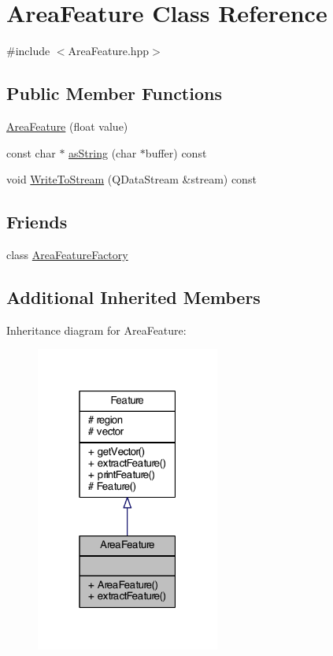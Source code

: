 \hypertarget{class_area_feature}{\section{Area\+Feature Class Reference}
\label{class_area_feature}
}


{\ttfamily \#include $<$Area\+Feature.\+hpp$>$}

\subsection*{Public Member Functions}
\begin{DoxyCompactItemize}
\item 
\hyperlink{class_area_feature_af65d43c5c868babfb6c429464f36a898}{Area\+Feature} (float value)
\item 
const char $\ast$ \hyperlink{class_area_feature_a6c0a6e3346ba2ddaa4a50cb957f08ab2}{as\+String} (char $\ast$buffer) const 
\item 
void \hyperlink{class_area_feature_a8d2f99d3cc8ff64b90c2eb8a4c97a72f}{Write\+To\+Stream} (Q\+Data\+Stream \&stream) const 
\end{DoxyCompactItemize}
\subsection*{Friends}
\begin{DoxyCompactItemize}
\item 
class \hyperlink{class_area_feature_acf274ff5848a30a105c61f0e1c56cf7e}{Area\+Feature\+Factory}
\end{DoxyCompactItemize}
\subsection*{Additional Inherited Members}


Inheritance diagram for Area\+Feature\+:\nopagebreak
\begin{figure}[H]
\begin{center}
\leavevmode
\includegraphics[width=171pt]{class_area_feature__inherit__graph}
\end{center}
\end{figure}


